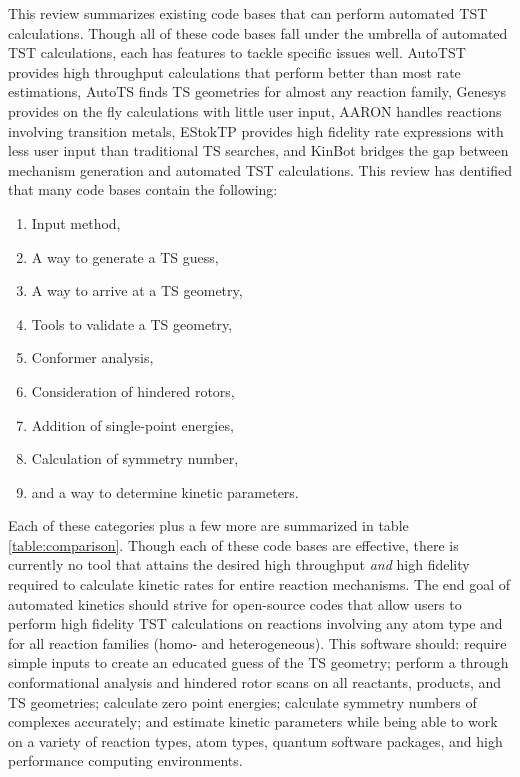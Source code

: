 \documentclass[preprint, 11pt]{elsarticle} %
\begin{document}
This review summarizes existing code bases that can perform automated TST calculations.
Though all of these code bases fall under the umbrella of automated TST calculations, each has features to tackle specific issues well.
AutoTST provides high throughput calculations that perform better than most rate estimations, AutoTS finds TS geometries for almost any reaction family, Genesys provides on the fly calculations with little user input, AARON handles reactions involving transition metals, EStokTP provides high fidelity rate expressions with less user input than traditional TS searches, and KinBot bridges the gap between mechanism generation and automated TST calculations. 
This review has dentified that many code bases contain the following:
\begin{enumerate}
    \item Input method,
    \item A way to generate a TS guess,
    \item A way to arrive at a TS geometry,
    \item Tools to validate a TS geometry,
    \item Conformer analysis,
    \item Consideration of hindered rotors,
    \item Addition of single-point energies,
    \item Calculation of symmetry number,
    \item and a way to determine kinetic parameters.
\end{enumerate}

Each of these categories plus a few more are summarized in table \ref{table:comparison}. 
Though each of these code bases are effective, there is currently no tool that attains the desired high throughput \textit{and} high fidelity required to calculate kinetic rates for entire reaction mechanisms.
The end goal of automated kinetics should strive for open-source codes that allow users to perform high fidelity TST calculations on reactions involving any atom type and for all reaction families (homo- and heterogeneous).
This software should: require simple inputs to create an educated guess of the TS geometry; perform a through conformational analysis and hindered rotor scans on all reactants, products, and TS geometries; calculate zero point energies; calculate symmetry numbers of complexes accurately; and estimate kinetic parameters while being able to work on a variety of reaction types, atom types, quantum software packages, and high performance computing environments.
\end{document}
